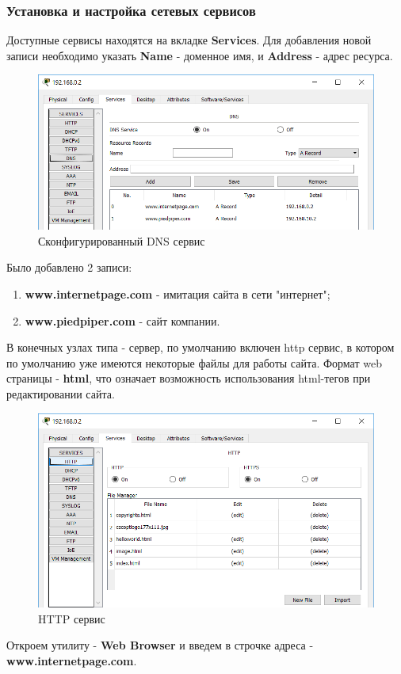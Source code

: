 \subsubsection{Установка и настройка сетевых сервисов}
Доступные сервисы находятся на вкладке \textbf{Services}. Для добавления новой записи необходимо указать \textbf{Name} - доменное имя, и \textbf{Address} - адрес ресурса.
\begin{figure}[H]
  \centering
  \includegraphics[width=.8\textwidth]{img/net0_0_2__2}
  \caption{Сконфигурированный DNS сервис}
\end{figure}
Было добавлено 2 записи:
\begin{enumerate}
\item \textbf{www.internetpage.com} - имитация сайта в сети "интернет";
\item \textbf{www.piedpiper.com} - сайт компании.
\end{enumerate}
В конечных узлах типа - сервер, по умолчанию включен http сервис, в котором по умолчанию уже имеются некоторые файлы для работы сайта. Формат web страницы - \textbf{html}, что означает возможность использования html-тегов при редактировании сайта.
\begin{figure}[H]
  \centering
  \includegraphics[width=.8\textwidth]{img/net0_0_2__4}
  \caption{HTTP сервис}
\end{figure}
Откроем утилиту - \textbf{Web Browser} и введем в строчке адреса - \textbf{www.internetpage.com}. 

